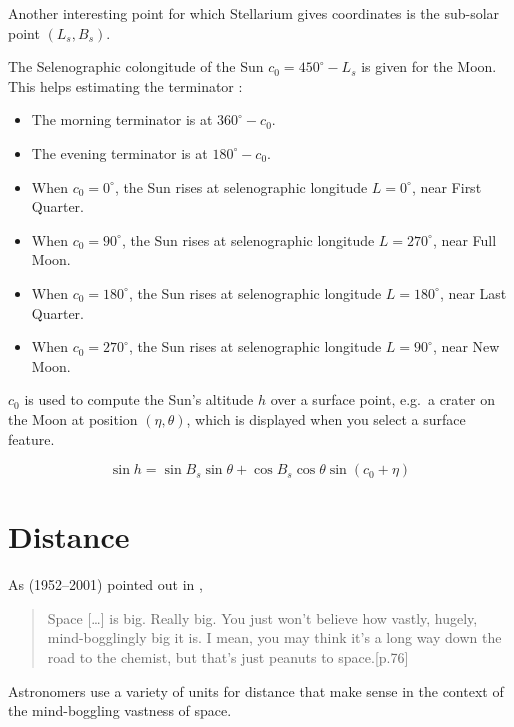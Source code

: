 Another interesting point for which Stellarium gives coordinates is
the sub-solar point $(L_s, B_s)$.

The Selenographic colongitude of the Sun $c_0=450^\circ-L_s$ is given for the
Moon. This helps estimating the terminator \citep{AstronomicalAlgorithms:1998}:
\begin{itemize}
\item The morning terminator is at $360^\circ-c_0$.
\item The evening terminator is at $180^\circ-c_0$.
\item When $c_0=0^\circ$, the Sun rises at selenographic longitude $L=0^\circ$, near First Quarter.
\item When $c_0=90^\circ$, the Sun rises at selenographic longitude $L=270^\circ$, near Full Moon.
\item When $c_0=180^\circ$, the Sun rises at selenographic longitude $L=180^\circ$, near Last Quarter.
\item When $c_0=270^\circ$, the Sun rises at selenographic longitude $L=90^\circ$, near New Moon.
\end{itemize}

$c_0$ is used to compute the Sun's altitude $h$ over a surface point,
e.g.\ a crater on the Moon at position $(\eta, \theta)$, which is
displayed when you select a surface feature.

\begin{equation}
\sin h=\sin B_s \sin\theta + \cos B_s \cos\theta \sin(c_0+\eta)
\end{equation}



\section{Distance}
\label{sec:Concepts:Distance}

As  (1952--2001) pointed out in ,
\begin{quote}
  Space [\ldots] is big. Really big. You just won't believe how vastly, hugely,
  mind-bogglingly big it is. I mean, you may think it's a long way
  down the road to the chemist, but that's just peanuts to
  space.[p.76]
\end{quote}
%
Astronomers use a variety of units for distance that make sense in the
context of the mind-boggling vastness of space.

